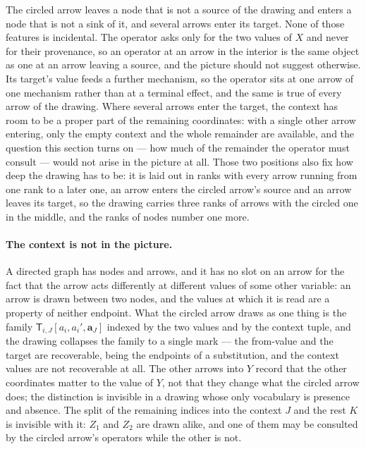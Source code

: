 \documentclass{article}
\theoremstyle{definition}
\theoremstyle{remark}
\begin{document}
The circled arrow leaves a node that is not a source of the drawing and enters a node that is not a sink of it, and several arrows enter its target. None of those features is incidental. The operator asks only for the two values of $X$ and never for their provenance, so an operator at an arrow in the interior is the same object as one at an arrow leaving a source, and the picture should not suggest otherwise. Its target's value feeds a further mechanism, so the operator sits at one arrow of one mechanism rather than at a terminal effect, and the same is true of every arrow of the drawing. Where several arrows enter the target, the context has room to be a proper part of the remaining coordinates: with a single other arrow entering, only the empty context and the whole remainder are available, and the question this section turns on --- how much of the remainder the operator must consult --- would not arise in the picture at all. Those two positions also fix how deep the drawing has to be: it is laid out in ranks with every arrow running from one rank to a later one, an arrow enters the circled arrow's source and an arrow leaves its target, so the drawing carries three ranks of arrows with the circled one in the middle, and the ranks of nodes number one more.

\paragraph{The context is not in the picture.} A directed graph has nodes and arrows, and it has no slot on an arrow for the fact that the arrow acts differently at different values of some other variable: an arrow is drawn between two nodes, and the values at which it is read are a property of neither endpoint. What the circled arrow draws as one thing is the family $\mathsf{T}_{i,J}[a_i, a_i', \boldsymbol{a}_J]$ indexed by the two values and by the context tuple, and the drawing collapses the family to a single mark --- the from-value and the target are recoverable, being the endpoints of a substitution, and the context values are not recoverable at all. The other arrows into $Y$ record that the other coordinates matter to the value of $Y$, not that they change what the circled arrow does; the distinction is invisible in a drawing whose only vocabulary is presence and absence. The split of the remaining indices into the context $J$ and the rest $K$ is invisible with it: $Z_1$ and $Z_2$ are drawn alike, and one of them may be consulted by the circled arrow's operators while the other is not.
\end{document}
